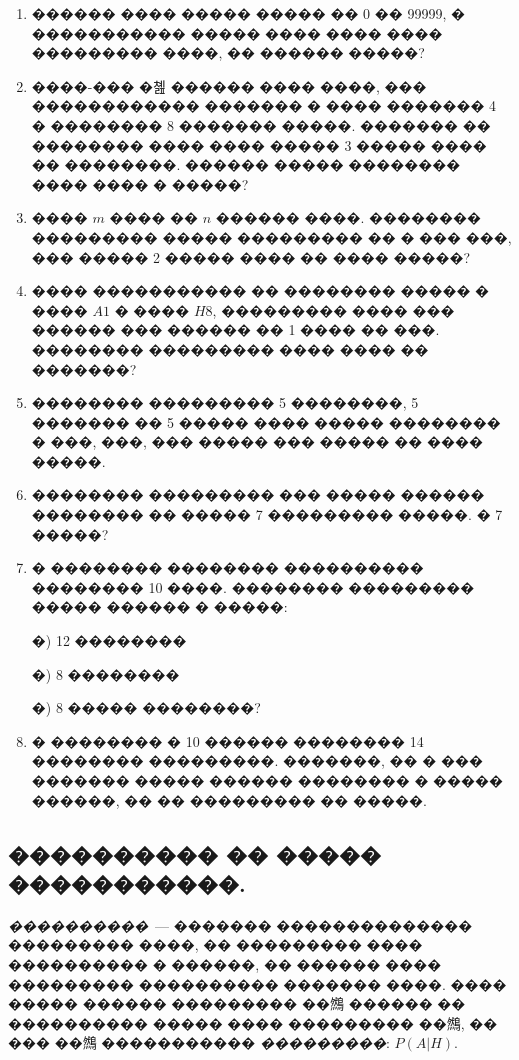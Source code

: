 \documentclass[a4paper,12pt]{article}
\begin{document}
\begin{enumerate}
\item ������ ���� ����� ����� �� 0 �� 99999, � ����������� ����� ���� ���� ���� ��������� ����, �� ������ �����?

\item ����-��� �쳺 ������ ���� ����, ��� ������������ ������� � ���� ������� 4 � �������� 8 ������� �����. ������� �� �������� ���� ���� ����� $3$ ����� ���� �� ��������. ������ ����� �������� ���� ���� � �����?

\item ���� $m$ ���� �� $n$ ������ ����. �������� ��������� ����� ��������� �� � ��� ���, ��� ����� 2 ����� ���� �� ���� �����?

\item ���� ����������� �� �������� ����� � ���� $A1$ � ���� $H8$, ��������� ���� ��� ������ ��� ������ �� 1 ���� �� ���. �������� ��������� ���� ���� �� �������?

\item �������� ��������� 5 ��������, 5 ������� �� 5 ����� ���� ����� �������� � ���, ���, ��� ����� ��� ����� �� ���� �����.

\item �������� ��������� ��� ����� ������ �������� �� ����� 7 ��������� �����. � 7 �����?

\item � �������� �������� ���������� �������� 10 ����. �������� ��������� ����� ������ � �����:

�) 12 ��������

�) 8 ��������

�) 8 ����� ��������?

\item � �������� � 10 ������ �������� 14 �������� ���������. �������, �� � ��� ������� ����� ������ �������� � ����� ������, �� �� ��������� �� �����.
\end{enumerate}










\newpage

\begin{center}
\section*{���������� �� ����� �����������.}
\end{center}

\textit{����������}~--- ������� �������������� ��������� ����, �� ��������� ���� ���������� � ������, �� ������ ���� ��������� ���������� ������� ����. ���� ����� ������ ��������� ��䳿 ������ �� ���������� ����� ���� ��������� ��䳿, �� ��� ��䳿 ����������� \textit{���������}: $P(A|H)$.
\end{document}
